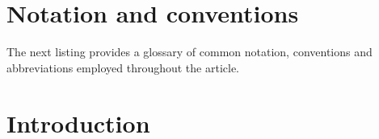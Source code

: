 \documentclass[11pt,reqno,a4letter]{article}
\numberwithin{figure}{section}
\numberwithin{table}{section}
\theoremstyle{plain}
\numberwithin{theorem}{section}
\theoremstyle{definition}
\begin{document}

\newpage
\renewcommand{\contentsname}{Article Index}
\setcounter{tocdepth}{2}
\tableofcontents

\newpage
\section*{Notation and conventions}
\label{Section_NotationAndConventions}

The next listing provides a glossary of common notation, conventions and 
abbreviations employed throughout the article. 

\renewcommand*{\glsclearpage}{}
\renewcommand{\glossarysection}[2][]{}
\printglossary[type={symbols},
               style={glossstyleSymbol},
               nogroupskip=true]

\newpage
\section{Introduction} 
\label{subSection_MertensMxClassical_Intro} 
\end{document}
